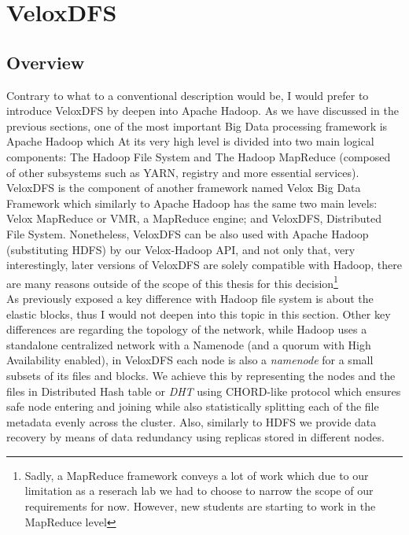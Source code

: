 \section{VeloxDFS}
\subsection{Overview}
Contrary to what to a conventional description would be, I would prefer to introduce
VeloxDFS by deepen into Apache Hadoop.  As we have discussed in the previous sections, 
one of the most important Big Data processing framework is Apache Hadoop which 
At its very high level is divided into two main logical components: 
The Hadoop File System and The Hadoop MapReduce (composed of other subsystems such as YARN, registry
and more essential services).  \\

VeloxDFS is the component of another framework named Velox Big Data Framework
which similarly to Apache Hadoop has the same two main levels: Velox MapReduce or VMR,
a MapReduce engine; and VeloxDFS, Distributed File System.  Nonetheless,
VeloxDFS can be also used with Apache Hadoop (substituting HDFS) by our Velox-Hadoop API, 
and not only that, very interestingly, later versions of VeloxDFS are solely compatible with
Hadoop, there are many reasons outside of the scope of this thesis for this decision\footnote{Sadly, a MapReduce framework conveys a lot of work which due to our limitation as a reserach lab we had to choose
to narrow the scope of our requirements for now. However, new students are starting to work in the MapReduce level}  \\

As previously exposed a key difference with Hadoop file system is
about the elastic blocks, thus I would not deepen into this topic in this
section. Other key differences are regarding the topology of the network, while
Hadoop uses a standalone centralized network with a Namenode (and a quorum with
High Availability enabled), in  VeloxDFS each node is also a \textit{namenode} for a small subsets of
its files and blocks. We achieve this by representing the nodes and the files
in Distributed Hash table or \textit{DHT} using CHORD-like protocol \cite{stoica2001chord} which ensures
safe node entering and joining while also statistically splitting each of the
file metadata evenly across the cluster. Also, similarly to HDFS we provide 
data recovery by means of data redundancy using replicas stored in different nodes.  \\ 

